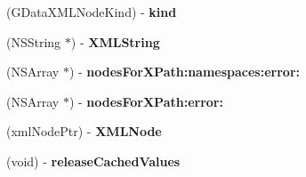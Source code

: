 \begin{DoxyCompactItemize}
\item 
\hypertarget{interface_g_data_x_m_l_node_a5e033ccdae3236c8875e1c6feb44c949}{(G\+Data\+X\+M\+L\+Node\+Kind) -\/ {\bfseries kind}}\label{interface_g_data_x_m_l_node_a5e033ccdae3236c8875e1c6feb44c949}

\item 
\hypertarget{interface_g_data_x_m_l_node_a958c434d973db58ada939d7276977812}{(N\+S\+String $\ast$) -\/ {\bfseries X\+M\+L\+String}}\label{interface_g_data_x_m_l_node_a958c434d973db58ada939d7276977812}

\item 
\hypertarget{interface_g_data_x_m_l_node_a93c2784d84fc245d99cf2943fc41c19c}{(N\+S\+Array $\ast$) -\/ {\bfseries nodes\+For\+X\+Path\+:namespaces\+:error\+:}}\label{interface_g_data_x_m_l_node_a93c2784d84fc245d99cf2943fc41c19c}

\item 
\hypertarget{interface_g_data_x_m_l_node_a48f3179efdba9b7e017aa32e7118907b}{(N\+S\+Array $\ast$) -\/ {\bfseries nodes\+For\+X\+Path\+:error\+:}}\label{interface_g_data_x_m_l_node_a48f3179efdba9b7e017aa32e7118907b}

\item 
\hypertarget{interface_g_data_x_m_l_node_a775ef8bdbcb26003bfd326930f028d44}{(xml\+Node\+Ptr) -\/ {\bfseries X\+M\+L\+Node}}\label{interface_g_data_x_m_l_node_a775ef8bdbcb26003bfd326930f028d44}

\item 
\hypertarget{interface_g_data_x_m_l_node_a71cb5af09b5c6737c452f2e09bcdec36}{(void) -\/ {\bfseries release\+Cached\+Values}}\label{interface_g_data_x_m_l_node_a71cb5af09b5c6737c452f2e09bcdec36}

\end{DoxyCompactItemize}
